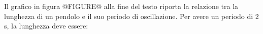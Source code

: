 Il grafico in figura @FIGURE@ alla fine del testo
riporta la relazione 
tra la lunghezza di un pendolo e il suo periodo di oscillazione.
Per avere un periodo di 2 s, la lunghezza deve essere:
